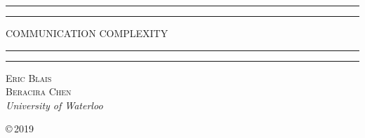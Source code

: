 \documentclass[11pt]{amsbook}
\theoremstyle{plain}
\theoremstyle{definition}
\theoremstyle{plain}
\begin{document}
\begin{titlepage}
\centering
\scshape
\vspace*{\baselineskip}

\rule{\textwidth}{1.6pt}\vspace*{-\baselineskip}\vspace*{2pt}
\rule{\textwidth}{0.4pt}

\vspace{0.75\baselineskip}
    {\LARGE COMMUNICATION COMPLEXITY\\}
\vspace{0.75\baselineskip}

\rule{\textwidth}{0.4pt}\vspace*{-\baselineskip}\vspace{3.2pt}
\rule{\textwidth}{1.6pt}

\vspace{2\baselineskip}

{\scshape\Large Eric Blais \\
 Beracira Chen \\}
\vspace{\baselineskip}
\textit{University of Waterloo}
	
\vfill

\copyright\,2019
\end{titlepage}


\frontmatter

\tableofcontents

\mainmatter



















\end{document}
